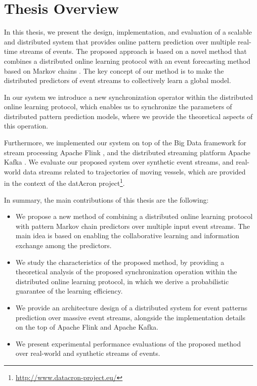 \section{Thesis Overview}
\par In this thesis, we present the design, implementation, and evaluation of a scalable and distributed system that provides online pattern prediction over multiple real-time streams of events. The proposed approach is based on a novel method that combines a distributed online learning protocol \cite{dekel2012optimal,kamp2014communication} with an event forecasting method based on Markov chains \cite{alevizos2017event}. The key concept of our method is to make the distributed predictors of event streams to collectively learn a global model. 

\par In our system we introduce a new synchronization operator within the distributed online learning protocol, which enables us to synchronize the parameters of distributed pattern prediction models, where we provide the theoretical aspects of this operation. 

Furthermore, we implemented our system on top of the Big Data framework for stream processing Apache Flink \cite{Flink}, and the distributed streaming platform Apache Kafka \cite{Kafka}. We evaluate our proposed system over synthetic event streams, and real-world data streams related to trajectories of moving vessels, which are provided in the context of the datAcron project\footnote{\url{http://www.datacron-project.eu/}}.

In summary, the main contributions of this thesis are the following:

\begin{itemize}
	
	\item We propose a new method of combining a distributed online learning protocol with pattern Markov chain predictors over multiple input event streams. The main idea is based on enabling the collaborative learning and information exchange among the predictors.  
	
	\item We study the characteristics of the proposed method, by providing a theoretical analysis of the proposed synchronization operation within the distributed online learning protocol, in which we derive a probabilistic guarantee of the learning efficiency. 
	\item We provide an architecture design of a distributed system for event patterns prediction over massive event streams, alongside the implementation details on the top of Apache Flink and Apache Kafka.  
	
	\item We present experimental performance evaluations of the proposed method over real-world and synthetic streams of events.
  
\end{itemize}

